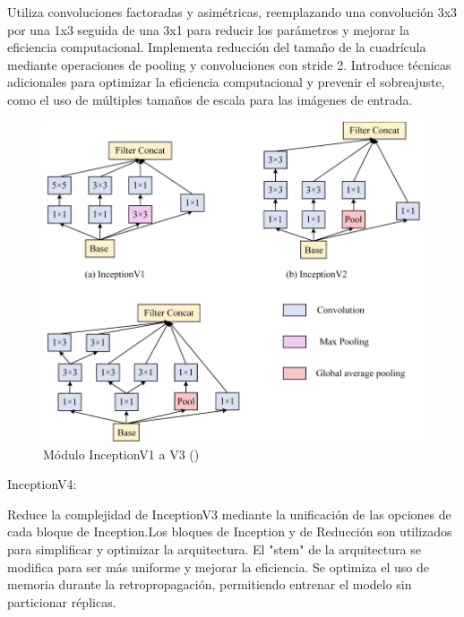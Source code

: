\begin{itemize}
  Utiliza convoluciones factoradas y asimétricas, reemplazando una convolución 3x3 por una 1x3 seguida de una 3x1 para reducir los parámetros y mejorar la eficiencia computacional.
  Implementa reducción del tamaño de la cuadrícula mediante operaciones de pooling y convoluciones con stride 2.
  Introduce técnicas adicionales para optimizar la eficiencia computacional y prevenir el sobreajuste, como el uso de múltiples tamaños de escala para las imágenes de entrada.
    \begin{figure}[H]
  	\begin{center}
  		\includegraphics[width=1\textwidth]{2/figures/cn55.jpeg}
  		\caption{  Módulo InceptionV1 a V3
  			(\cite{tecnica2})}
  	\end{center}
  	\end{figure}
  InceptionV4:
  
  Reduce la complejidad de InceptionV3 mediante la unificación de las opciones de cada bloque de Inception.Los bloques de Inception y de Reducción son utilizados para simplificar y optimizar la arquitectura. El "stem" de la arquitectura se modifica para ser más uniforme y mejorar la eficiencia. Se optimiza el uso de memoria durante la retropropagación, permitiendo entrenar el modelo sin particionar réplicas.
  

\end{itemize}
